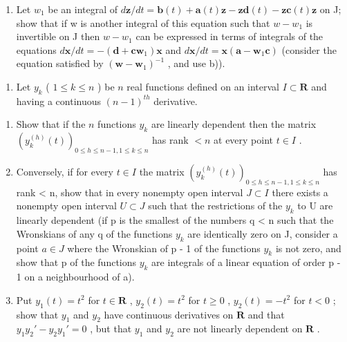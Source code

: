 \begin{enumerate}
\def\labelenumi{\alph{enumi})}
\setcounter{enumi}{3}
\tightlist
\item
  Let \(w_{1}\) be an integral of \(d\mathbf{z}/dt = \mathbf{b}(t) + \mathbf{a}(t)\mathbf{z} - \mathbf{z}\mathbf{d}(t) - \mathbf{z}\mathbf{c}(t)\mathbf{z}\) on J; show that if w is another integral of this equation such that \(w - w_{1}\) is invertible on J then \(w - w_{1}\) can be expressed in terms of integrals of the equations \(d\mathbf{x}/dt = -(\mathbf{d} + \mathbf{c}\mathbf{w}_{1})\mathbf{x}\) and \(d\mathbf{x}/dt = \mathbf{x}(\mathbf{a} - \mathbf{w}_{1}\mathbf{c})\) (consider the equation satisfied by \((\mathbf{w} - \mathbf{w}_{1})^{-1}\) , and use b)).
\end{enumerate}

\begin{enumerate}
\def\labelenumi{\arabic{enumi})}
\setcounter{enumi}{8}
\tightlist
\item
  Let \(y_{k}\) ( \(1 \leqslant k \leqslant n\) ) be \(n\) real functions defined on an interval \(I \subset \mathbf{R}\) and having a continuous \((n - 1)^{th}\) derivative.
\end{enumerate}

\begin{enumerate}
\def\labelenumi{\alph{enumi})}
\item
  Show that if the \(n\) functions \(y_{k}\) are linearly dependent then the matrix \((y_{k}^{(h)}(t))_{0\leqslant h\leqslant n - 1, 1\leqslant k\leqslant n}\) has rank \(< n\) at every point \(t\in I\) .
\item
  Conversely, if for every \(t \in I\) the matrix \((y_{k}^{(h)}(t))_{0 \leqslant h \leqslant n-1, 1 \leqslant k \leqslant n}\) has rank \textless{} n, show that in every nonempty open interval \(J \subset I\) there exists a nonempty open interval \(U \subset J\) such that the restrictions of the \(y_{k}\) to U are linearly dependent (if p is the smallest of the numbers q \textless{} n such that the Wronskians of any q of the functions \(y_{k}\) are identically zero on J, consider a point \(a \in J\) where the Wronskian of p - 1 of the functions \(y_{k}\) is not zero, and show that p of the functions \(y_{k}\) are integrals of a linear equation of order p - 1 on a neighbourhood of a).
\item
  Put \(y_{1}(t) = t^{2}\) for \(t \in \mathbf{R}\) , \(y_{2}(t) = t^{2}\) for \(t \geqslant 0\) , \(y_{2}(t) = -t^{2}\) for \(t < 0\) ; show that \(y_{1}\) and \(y_{2}\) have continuous derivatives on \(\mathbf{R}\) and that \(y_{1}y_{2}' - y_{2}y_{1}' = 0\) , but that \(y_{1}\) and \(y_{2}\) are not linearly dependent on \(\mathbf{R}\) .
\end{enumerate}

